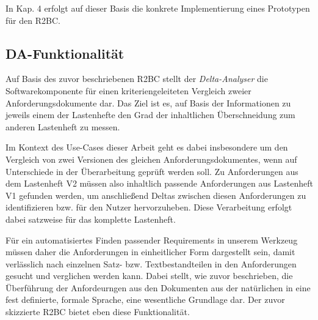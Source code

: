 \documentclass[12pt]{report}
\begin{document}
In Kap. 4 erfolgt auf dieser Basis die konkrete Implementierung eines Prototypen für den R2BC.
\subsection{DA-Funktionalität}
Auf Basis des zuvor beschriebenen R2BC stellt der \textit{Delta-Analyser} die Softwarekomponente für einen kriteriengeleiteten Vergleich zweier Anforderungsdokumente dar. Das Ziel ist es, auf Basis der Informationen zu jeweils einem der Lastenhefte den Grad der inhaltlichen Überschneidung zum anderen Lastenheft zu messen. 

Im Kontext des Use-Cases dieser Arbeit geht es dabei insbesondere um den Vergleich von zwei Versionen des gleichen Anforderungsdokumentes, wenn auf Unterschiede in der Überarbeitung geprüft werden soll. Zu Anforderungen aus dem Lastenheft V2 müssen also inhaltlich passende Anforderungen aus Lastenheft V1 gefunden werden, um anschließend Deltas zwischen diesen Anforderungen zu identifizieren bzw. für den Nutzer hervorzuheben. Diese Verarbeitung erfolgt dabei satzweise für das komplette Lastenheft. 

Für ein automatisiertes Finden passender Requirements in unserem Werkzeug müssen daher die Anforderungen in einheitlicher Form dargestellt sein, damit verlässlich nach einzelnen Satz- bzw. Textbestandteilen in den Anforderungen gesucht und verglichen werden kann.
Dabei stellt, wie zuvor beschrieben, die Überführung der Anfordeurngen aus den Dokumenten aus der natürlichen in eine fest definierte, formale Sprache, eine wesentliche Grundlage dar. Der zuvor skizzierte R2BC bietet eben diese Funktionalität.
\end{document}
